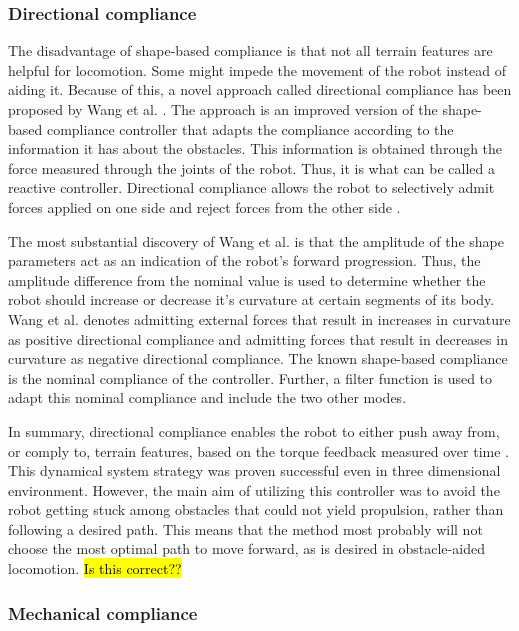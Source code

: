 \subsubsection{Directional compliance}

The disadvantage of shape-based compliance is that not all terrain features are helpful for locomotion. Some might impede the movement of the robot instead of aiding it. Because of this, a novel approach called directional compliance has been proposed by Wang et al. \cite{wang2020directional}. The approach is an improved version of the shape-based compliance controller that adapts the compliance according to the information it has about the obstacles. This information is obtained through the force measured through the joints of the robot. Thus, it is what can be called a reactive controller. Directional compliance allows the robot to selectively admit forces applied on one side and reject forces from the other side \cite{wang2020directional}.

The most substantial discovery of Wang et al. \cite{wang2020directional} is that the amplitude of the shape parameters act as an indication of the robot's forward progression. Thus, the amplitude difference from the nominal value is used to determine whether the robot should increase or decrease it's curvature at certain segments of its body. Wang et al. \cite{wang2020directional} denotes admitting external forces that result in increases in curvature as positive directional compliance and admitting forces that result in decreases in curvature as negative directional compliance. The known shape-based compliance is the nominal compliance of the controller. Further, a filter function is used to adapt this nominal compliance and include the two other modes.

In summary, directional compliance enables the robot to either push away from, or comply to, terrain features, based on the torque feedback measured over time \cite{wang2020directional}. This dynamical system strategy was proven successful even in three dimensional environment. However, the main aim of utilizing this controller was to avoid the robot getting stuck among obstacles that could not yield propulsion, rather than following a desired path. This means that the method most probably will not choose the most optimal path to move forward, as is desired in obstacle-aided locomotion.
\hl{Is this correct??}

\subsubsection{Mechanical compliance}

